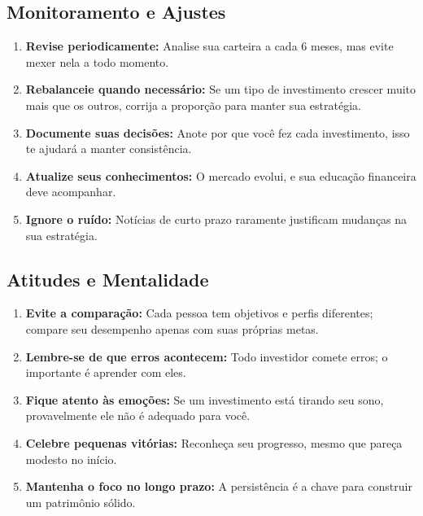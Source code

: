 \subsection{Monitoramento e Ajustes}
\begin{enumerate}[resume]
    \item \textbf{Revise periodicamente:} Analise sua carteira a cada 6 meses, mas evite mexer nela a todo momento.
    
    \item \textbf{Rebalanceie quando necessário:} Se um tipo de investimento crescer muito mais que os outros, corrija a proporção para manter sua estratégia.
    
    \item \textbf{Documente suas decisões:} Anote por que você fez cada investimento, isso te ajudará a manter consistência.
    
    \item \textbf{Atualize seus conhecimentos:} O mercado evolui, e sua educação financeira deve acompanhar.
    
    \item \textbf{Ignore o ruído:} Notícias de curto prazo raramente justificam mudanças na sua estratégia.
\end{enumerate}

\subsection{Atitudes e Mentalidade}
\begin{enumerate}[resume]
    \item \textbf{Evite a comparação:} Cada pessoa tem objetivos e perfis diferentes; compare seu desempenho apenas com suas próprias metas.
    
    \item \textbf{Lembre-se de que erros acontecem:} Todo investidor comete erros; o importante é aprender com eles.
    
    \item \textbf{Fique atento às emoções:} Se um investimento está tirando seu sono, provavelmente ele não é adequado para você.
    
    \item \textbf{Celebre pequenas vitórias:} Reconheça seu progresso, mesmo que pareça modesto no início.
    
    \item \textbf{Mantenha o foco no longo prazo:} A persistência é a chave para construir um patrimônio sólido.
\end{enumerate}

